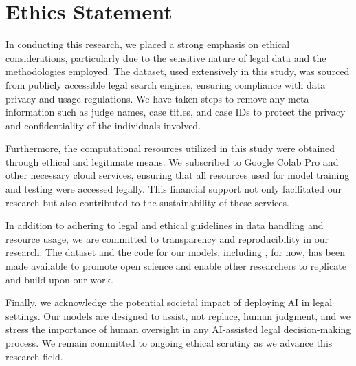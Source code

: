 \section*{Ethics Statement}
In conducting this research, we placed a strong emphasis on ethical considerations, particularly due to the sensitive nature of legal data and the methodologies employed. The \texttt{\named} dataset, used extensively in this study, was sourced from publicly accessible legal search engines, ensuring compliance with data privacy and usage regulations. We have taken steps to remove any meta-information such as judge names, case titles, and case IDs to protect the privacy and confidentiality of the individuals involved.

Furthermore, the computational resources utilized in this study were obtained through ethical and legitimate means. We subscribed to Google Colab Pro and other necessary cloud services, ensuring that all resources used for model training and testing were accessed legally. This financial support not only facilitated our research but also contributed to the sustainability of these services.

In addition to adhering to legal and ethical guidelines in data handling and resource usage, we are committed to transparency and reproducibility in our research. The \texttt{\named} dataset and the code for our models, including \texttt{\namel}, for now, has been made available to promote open science and enable other researchers to replicate and build upon our work.

Finally, we acknowledge the potential societal impact of deploying AI in legal settings. Our models are designed to assist, not replace, human judgment, and we stress the importance of human oversight in any AI-assisted legal decision-making process. We remain committed to ongoing ethical scrutiny as we advance this research field.